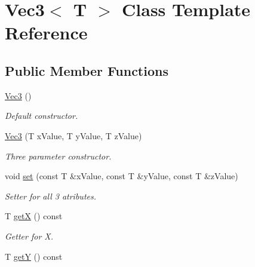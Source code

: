 \hypertarget{classVec3}{}\section{Vec3$<$ T $>$ Class Template Reference}
\label{classVec3}
\subsection*{Public Member Functions}
\begin{DoxyCompactItemize}
\item 
\hypertarget{classVec3_a7c150f37ecfa78ced8b83bd95908cc33}{}\hyperlink{classVec3_a7c150f37ecfa78ced8b83bd95908cc33}{Vec3} ()\label{classVec3_a7c150f37ecfa78ced8b83bd95908cc33}

\begin{DoxyCompactList}\small\item\em Default constructor. \end{DoxyCompactList}\item 
\hypertarget{classVec3_ae5f1be1f4936b564b8ef760dded77f93}{}\hyperlink{classVec3_ae5f1be1f4936b564b8ef760dded77f93}{Vec3} (T x\+Value, T y\+Value, T z\+Value)\label{classVec3_ae5f1be1f4936b564b8ef760dded77f93}

\begin{DoxyCompactList}\small\item\em Three parameter constructor. \end{DoxyCompactList}\item 
\hypertarget{classVec3_a9003d0d159f619d62400cf865ca9d47b}{}void \hyperlink{classVec3_a9003d0d159f619d62400cf865ca9d47b}{set} (const T \&x\+Value, const T \&y\+Value, const T \&z\+Value)\label{classVec3_a9003d0d159f619d62400cf865ca9d47b}

\begin{DoxyCompactList}\small\item\em Setter for all 3 atributes. \end{DoxyCompactList}\item 
\hypertarget{classVec3_a0b82143ab072d3215ded4100e9fa38f9}{}T \hyperlink{classVec3_a0b82143ab072d3215ded4100e9fa38f9}{get\+X} () const \label{classVec3_a0b82143ab072d3215ded4100e9fa38f9}

\begin{DoxyCompactList}\small\item\em Getter for X. \end{DoxyCompactList}\item 
\hypertarget{classVec3_a351092c8c47c6974ff607a4e03669990}{}T \hyperlink{classVec3_a351092c8c47c6974ff607a4e03669990}{get\+Y} () const \label{classVec3_a351092c8c47c6974ff607a4e03669990}


\end{DoxyCompactItemize}
